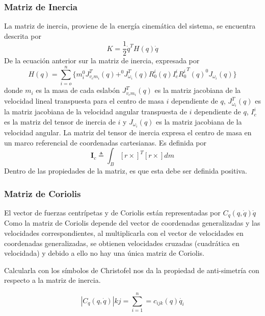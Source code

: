 \documentclass[journal]{IEEEtran}
\begin{document}
    \subsubsection{Matriz de Inercia}
    La matriz de inercia, proviene de la energía cinemática del sistema, se encuentra descrita por
    \begin{equation*}
        K = \frac{1}{2} \dot{q}^T H(q)\dot{q}
    \end{equation*}
    De la ecuación anterior sur la matriz de inercia, expresada por
    \begin{equation*}
        H(q) = \sum_{i=o} ^n \{ m_i ^0 J_{v_cm_i} ^T(q) + ^0J_{\omega_i} ^T (q) R_0 ^i(q) I_c ^i {R_0 ^i}^T (q) ^0 J_{\omega_i} (q) \}
    \end{equation*}
    donde $m_i$ es la masa de cada eslabón $J_{v_cm_i}^T(q)$ es la matriz jacobiana de la velocidad lineal transpuesta para
    el centro de masa $i$ dependiente de $q$, $J_{\omega_i} ^T (q)$ es la matriz jacobiana de la velocidad angular transpuesta
    de $i$  dependiente de $q$, $I_c ^i$ es la matriz del tensor de inercia de $i$ y $J_{\omega_i} (q)$ es la matriz jacobiana
    de la velocidad angular.
    La matriz del tensor de inercia expresa el centro de masa en un marco referencial de coordenadas cartesianas. Es definida por
    \begin{equation*}
        \textbf{I}_c \triangleq \int_B [r \times]^T [r \times] dm 
    \end{equation*}
    Dentro de las propiedades de la matriz, es que esta debe ser definida positiva. \\

    \subsubsection{Matriz de Coriolis}
    El vector de fuerzas centrípetas y de Coriolis están representadas por $C_{q}(q,\dot{q})\dot{q}$ 
    Como la matriz de Coriolis depende del vector de coordenadas generalizadas y las velocidades correspondientes, al
    multiplicarla con el vector de velocidades en coordenadas generalizadas, se obtienen velocidades cruzadas (cuadrática en velocidada)
    y debido a ello no hay una única matriz de Coriolis. 

    Calcularla con los símbolos de Christofel nos da la propiedad de anti-simetría con respecto a la matriz de inercia.

    $$\left | C_{q}(q,\dot{q}) \right |{k j}=\sum_{i=1}^{n}=c_{ijk}(q)\dot{q_{i}}$$
\end{document}
